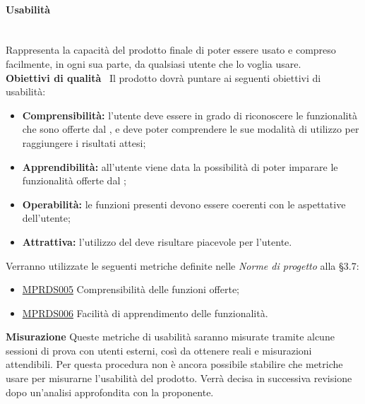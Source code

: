 \paragraph{Usabilità}\mbox{}\\[0.4cm]
Rappresenta la capacità del prodotto finale di poter essere usato e compreso facilmente, in ogni sua parte, da qualsiasi utente che lo voglia usare.\\[0.4cm]
\textbf{Obiettivi di qualità} \ Il prodotto dovrà puntare ai seguenti obiettivi di usabilità:
\begin{itemize}
	\item \textbf{Comprensibilità:} l'utente deve essere in grado di riconoscere le funzionalità che sono offerte dal , e deve poter comprendere le sue modalità di utilizzo per raggiungere i risultati attesi;
	\item \textbf{Apprendibilità:} all'utente viene data la possibilità di poter imparare le funzionalità offerte dal ;
	\item \textbf{Operabilità:} le funzioni presenti devono essere coerenti con le aspettative dell'utente;
	\item \textbf{Attrattiva:} l'utilizzo del  deve risultare piacevole per l'utente.
\end{itemize}
Verranno utilizzate le seguenti metriche definite nelle \textit{Norme di progetto} alla §3.7:
\begin{itemize}
	\item \hyperref[sec:qualita_software]{MPRDS005} Comprensibilità delle funzioni offerte;
	\item \hyperref[sec:qualita_software]{MPRDS006} Facilità di apprendimento delle funzionalità.
\end{itemize}

\textbf{Misurazione}
Queste metriche di usabilità saranno misurate tramite alcune sessioni di prova con utenti esterni, così da ottenere  reali e misurazioni attendibili. Per questa procedura non è ancora possibile stabilire che metriche usare per misurarne l'usabilità del prodotto. Verrà decisa in successiva revisione dopo un'analisi approfondita con la proponente.

